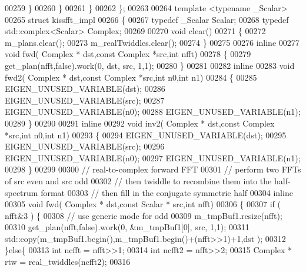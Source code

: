 \begin{DoxyCode}
00259         \}
00260       \}
00261     \}
00262 \};
00263 
00264 \textcolor{keyword}{template} <\textcolor{keyword}{typename} \_Scalar>
00265 \textcolor{keyword}{struct }kissfft\_impl
00266 \{
00267   \textcolor{keyword}{typedef} \_Scalar Scalar;
00268   \textcolor{keyword}{typedef} std::complex<Scalar> Complex;
00269 
00270   \textcolor{keywordtype}{void} clear() 
00271   \{
00272     m\_plans.clear();
00273     m\_realTwiddles.clear();
00274   \}
00275 
00276   \textcolor{keyword}{inline}
00277     \textcolor{keywordtype}{void} fwd( Complex * dst,\textcolor{keyword}{const} Complex *src,\textcolor{keywordtype}{int} nfft)
00278     \{
00279       get\_plan(nfft,\textcolor{keyword}{false}).work(0, dst, src, 1,1);
00280     \}
00281 
00282   \textcolor{keyword}{inline}
00283     \textcolor{keywordtype}{void} fwd2( Complex * dst,\textcolor{keyword}{const} Complex *src,\textcolor{keywordtype}{int} n0,\textcolor{keywordtype}{int} n1)
00284     \{
00285         EIGEN\_UNUSED\_VARIABLE(dst);
00286         EIGEN\_UNUSED\_VARIABLE(src);
00287         EIGEN\_UNUSED\_VARIABLE(n0);
00288         EIGEN\_UNUSED\_VARIABLE(n1);
00289     \}
00290 
00291   \textcolor{keyword}{inline}
00292     \textcolor{keywordtype}{void} inv2( Complex * dst,\textcolor{keyword}{const} Complex *src,\textcolor{keywordtype}{int} n0,\textcolor{keywordtype}{int} n1)
00293     \{
00294         EIGEN\_UNUSED\_VARIABLE(dst);
00295         EIGEN\_UNUSED\_VARIABLE(src);
00296         EIGEN\_UNUSED\_VARIABLE(n0);
00297         EIGEN\_UNUSED\_VARIABLE(n1);
00298     \}
00299 
00300   \textcolor{comment}{// real-to-complex forward FFT}
00301   \textcolor{comment}{// perform two FFTs of src even and src odd}
00302   \textcolor{comment}{// then twiddle to recombine them into the half-spectrum format}
00303   \textcolor{comment}{// then fill in the conjugate symmetric half}
00304   \textcolor{keyword}{inline}
00305     \textcolor{keywordtype}{void} fwd( Complex * dst,\textcolor{keyword}{const} Scalar * src,\textcolor{keywordtype}{int} nfft) 
00306     \{
00307       \textcolor{keywordflow}{if} ( nfft&3  ) \{
00308         \textcolor{comment}{// use generic mode for odd}
00309         m\_tmpBuf1.resize(nfft);
00310         get\_plan(nfft,\textcolor{keyword}{false}).work(0, &m\_tmpBuf1[0], src, 1,1);
00311         std::copy(m\_tmpBuf1.begin(),m\_tmpBuf1.begin()+(nfft>>1)+1,dst );
00312       \}\textcolor{keywordflow}{else}\{
00313         \textcolor{keywordtype}{int} ncfft = nfft>>1;
00314         \textcolor{keywordtype}{int} ncfft2 = nfft>>2;
00315         Complex * rtw = real\_twiddles(ncfft2);
00316 

\end{DoxyCode}
